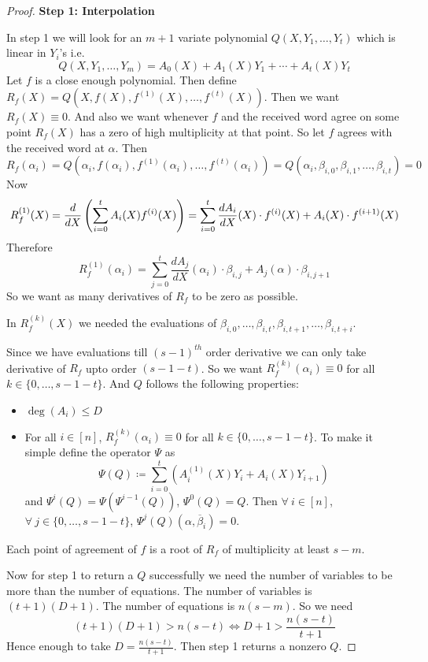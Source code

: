 \begin{proof}
    \textbf{Step 1: Interpolation}


In step 1 we will look for an $m+1$ variate polynomial $Q(X,Y_1,\dots, Y_t)$ which is linear in $Y_i$'s i.e. $$Q(X,Y_1,\dots, Y_m)=A_0(X)+A_1(X)Y_1+\cdots +A_t(X)Y_t$$Let $f$ is a close enough polynomial. Then define $R_f(X)=Q(X,f(X), f^{(1)}(X),\dots, f^{(t)}(X))$.  Then we want $R_f(X)\equiv 0$. And also we want whenever $f$ and the received word agree on some point $R_f(X)$ has a zero of high multiplicity at that point. So let $f$ agrees with the received word at $\alpha$. Then $$R_f(\alpha_i)=Q(\alpha_i, f(\alpha_i), f^{(1)}(\alpha_i),\dots, f^{(t)}(\alpha_i))=Q(\alpha_i, \beta_{i,0},\beta_{i,1},\dots, \beta_{i,t})=0$$Now \begin{align*}
            R_f^{(1)}(X)=\frac{d}{dX}\left(\sum\limits_{i=0}^tA_i(X)f^{(i)}(X)\right)=\sum\limits_{i=0}^t\frac{dA_i}{dX}(X)\cdot f^{(i)}(X)+A_i(X)\cdot f^{(i+1)}(X)
        \end{align*}Therefore $$ R_f^{(1)}(\alpha_i)=\sum\limits_{j=0}^t\frac{dA_j}{dX}(\alpha_i)\cdot \beta_{i,j}+A_j(\alpha)\cdot \beta_{i,j+1}$$ So we want as many derivatives of $R_f$ to be zero as possible. \begin{observation}
In $R_f^{(k)}(X)$ we needed the evaluations of $\beta_{i,0},\dots, \beta_{i,t},\beta_{i,t+1},\dots, \beta_{i,t+i}$.
\end{observation}Since we have evaluations till $(s-1)^{th}$ order derivative we can only take derivative of $R_f$ upto order $(s-1-t)$. So we want $R_f^{(k)}(\alpha_i)\equiv 0$ for all $k\in\{0,\dots, s-1-t\}$. And $Q$ follows the following properties:
\begin{itemize}
    \item $\deg(A_i)\leq D$ 
    \item For all $i\in[n]$, $R_f^{(k)}(\alpha_i)\equiv 0$ for all $k\in\{0,\dots, s-1-t\}$. To make it simple define the operator $\Psi$ as $$\Psi(Q)\coloneqq \sum\limits_{i=0}^t(A_i^{(1)}(X)Y_i+A_i(X)Y_{i+1})$$ and $\Psi^i(Q)=\Psi(\Psi^{i-1}(Q))$, $\Psi^0(Q)=Q$. Then $\forall\ i\in[n]$, $\forall\ j\in\{0,\dots, s-1-t\}$, $\Psi^j(Q)(\alpha,\overline{\beta}_i)=0$.
\end{itemize}
\begin{observation}
    Each point of agreement of $f$ is a root of $R_f$ of multiplicity at least $s-m$.
\end{observation}
Now for step 1 to return a $Q$ successfully we need the number of variables to be more than the number of equations. The number of variables is $(t+1)(D+1)$. The number of equations is $n(s-m)$. So we need $$(t+1)(D+1)>n(s-t)\iff D+1>\frac{n(s-t)}{t+1}$$Hence enough to take $D=\frac{n(s-t)}{t+1}$. Then step 1 returns a nonzero $Q$. 


\end{proof}
